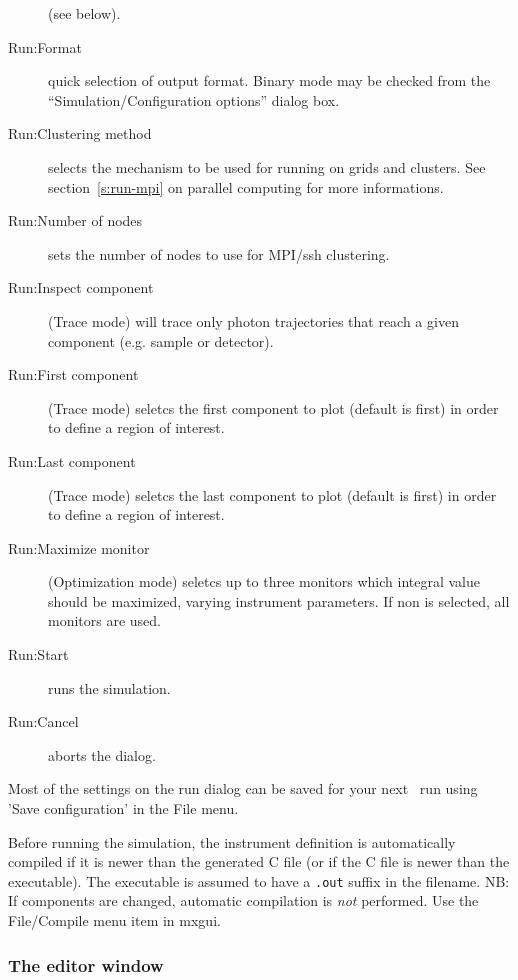 \begin{description}
  (see below).
\item[Run:Format] quick selection of output format. Binary mode may be checked from the ``Simulation/Configuration options'' dialog box.
\item[Run:Clustering method] selects the mechanism to be used for running on grids and clusters.
  See section~\ref{s:run-mpi} on parallel computing for more informations.
\item[Run:Number of nodes] sets the number of nodes to use for MPI/ssh clustering.
\item[Run:Inspect component] (Trace mode) will trace only photon trajectories that reach a given component (e.g. sample or detector).
\item[Run:First component] (Trace mode) seletcs the first component to plot (default is first) in order to define a region of interest.
\item[Run:Last component] (Trace mode) seletcs the last component to plot (default is first) in order to define a region of interest.
\item[Run:Maximize monitor] (Optimization mode) seletcs up to three monitors which integral value should be maximized, varying instrument parameters. If non is selected, all monitors are used.
\item[Run:Start] runs the simulation.
\item[Run:Cancel] aborts the dialog.
\end{description}
Most of the settings on the run dialog can be saved for your next
\MCX\ run using 'Save configuration' in the File menu.

Before running the simulation, the instrument definition is
automatically compiled if it is newer than the generated C file (or if the C file
is newer than the executable). The executable is
assumed to have a \verb+.out+ suffix in the filename. NB: If
components are changed, automatic compilation is \emph{not}
performed. Use the File/Compile menu item in mxgui.



\subsubsection{The editor window}

